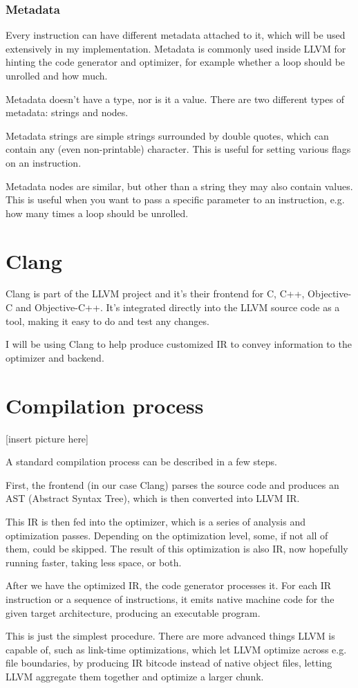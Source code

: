\subsubsection{Metadata}
Every instruction can have different metadata attached to it, which will be used extensively in my implementation. Metadata is commonly used inside LLVM for hinting the code generator and optimizer, for example whether a loop should be unrolled and how much.

Metadata doesn't have a type, nor is it a value. There are two different types of metadata: strings and nodes.

Metadata strings are simple strings surrounded by double quotes, which can contain any (even non-printable) character. This is useful for setting various flags on an instruction.

Metadata nodes are similar, but other than a string they may also contain values. This is useful when you want to pass a specific parameter to an instruction, e.g. how many times a loop should be unrolled.

\section{Clang}
Clang \cite{llvm_clang} is part of the LLVM project and it's their frontend for C, C++, Objective-C and Objective-C++. It's integrated directly into the LLVM source code as a tool, making it easy to do and test any changes.

I will be using Clang to help produce customized IR to convey information to the optimizer and backend.

\section{Compilation process}
[insert picture here]

A standard compilation process can be described in a few steps.

First, the frontend (in our case Clang) parses the source code and produces an AST (Abstract Syntax Tree), which is then converted into LLVM IR.

This IR is then fed into the optimizer, which is a series of analysis and optimization passes. Depending on the optimization level, some, if not all of them, could be skipped. The result of this optimization is also IR, now hopefully running faster, taking less space, or both.

After we have the optimized IR, the code generator processes it. For each IR instruction or a sequence of instructions, it emits native machine code for the given target architecture, producing an executable program.

This is just the simplest procedure. There are more advanced things LLVM is capable of, such as link-time optimizations, which let LLVM optimize across e.g. file boundaries, by producing IR bitcode instead of native object files, letting LLVM aggregate them together and optimize a larger chunk.